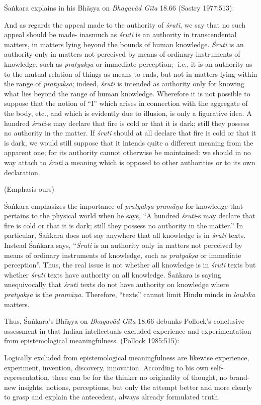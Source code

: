 Śaṅkara explains in his Bhāṣya on {\sl Bhagavād Gīta} 18.66 (Sastry 1977:513):
\begin{myquote}
And as regards the appeal made to the authority of {\sl śruti}, we say that no such appeal should be made- inasmuch as {\sl śruti} is an authority in transcendental matters, in matters lying beyond the bounds of human knowledge. {\sl Śruti} is an authority only in matters not perceived by means of ordinary instruments of knowledge, such as {\sl pratyakṣa} or immediate perception; -i.e., it is an authority as to the mutual relation of things as means to ends, but not in matters lying within the range of {\sl pratyakṣa}; indeed, {\sl śruti} is intended as authority only for knowing what lies beyond the range of human knowledge. Wherefore it is not possible to suppose that the notion of ``I'' which arises in connection with the aggregate of the body, etc., and which is evidently due to illusion, is only a figurative idea. A hundred {\sl śruti}-s may declare that fire is cold or that it is dark; still they possess no authority in the matter. If {\sl śruti} should at all declare that fire is cold or that it is dark, we would still suppose that it intends quite a different meaning from the apparent one; for its authority cannot otherwise be maintained: we should in no way attach to {\sl śruti} a meaning which is opposed to other authorities or to its own declaration.

\hfill (Emphasis ours)
\end{myquote}

Śaṅkara emphasizes the importance of {\sl pratyakṣa-pramāṇa} for knowledge that pertains to the physical world when he says, ``A hundred {\sl śruti}-s may declare that fire is cold or that it is dark; still they possess no authority in the matter.''  In particular, Śaṅkara does not say anywhere that all knowledge is in {\sl śruti} texts. Instead Śaṅkara says, ``{\sl Śruti} is an authority only in matters not perceived by means of ordinary instruments of knowledge, such as {\sl pratyakṣa} or immediate perception''. Thus, the real issue is not whether all knowledge is in {\sl śruti} texts but whether {\sl śruti} texts have authority on all knowledge.  Śaṅkara is saying unequivocally that {\sl śruti} texts do not have authority on knowledge where {\sl pratyakṣa} is the {\sl pramāṇa}. Therefore, ``texts'' cannot limit Hindu minds in {\sl laukika} matters.

Thus, Śaṅkara's Bhāṣya on {\sl Bhagavād Gīta} 18.66 debunks Pollock's conclusive assessment in that Indian intellectuals excluded experience and experimentation from epistemological meaningfulness. (Pollock 1985:515):
\begin{myquote}
Logically excluded from epistemological meaningfulness are likewise experience, experiment, invention, discovery, innovation.  According to his own self-representation, there can be for the thinker no originality of thought, no brand-new insights, notions, perceptions, but only the attempt better and more clearly to grasp and explain the antecedent, always already formulated truth.
\end{myquote}

